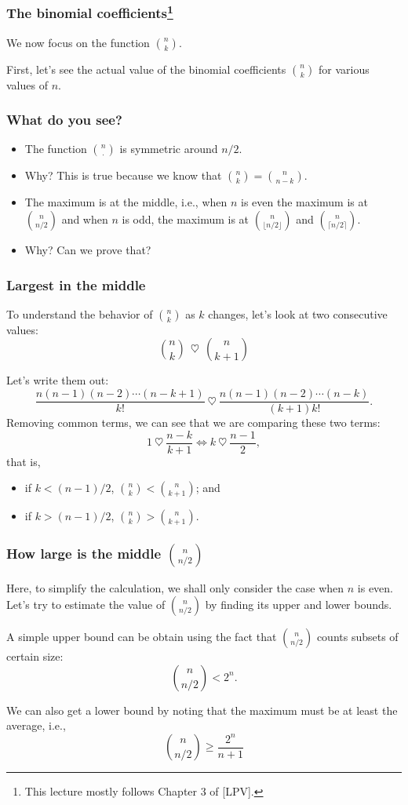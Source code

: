 \begin{frame}\frametitle{The binomial coefficients\footnote{This lecture mostly follows Chapter 3 of [LPV].}}
  We now focus on the function $\binom{n}{k}$.

  First, let's see the actual value of the binomial coefficients
  $\binom{n}{k}$ for various values of $n$.  \vspace{2in}
\end{frame}

\begin{frame}\frametitle{What do you see?}
  \begin{itemize}
  \item The function $\binom{n}{\cdot}$ is symmetric around $n/2$.
  \item Why? \pause This is true because we know that $\binom{n}{k}=\binom{n}{n-k}$. \pause
  \item The maximum is at the middle, i.e., when $n$ is even the
    maximum is at $\binom{n}{n/2}$ and when $n$ is odd, the maximum is
    at $\binom{n}{\lfloor n/2 \rfloor}$ and $\binom{n}{\lceil
      n/2\rceil}$.
  \item Why? \pause Can we prove that?
  \end{itemize}
\end{frame}

\begin{frame}\frametitle{Largest in the middle}
  To understand the behavior of $\binom{n}{k}$ as $k$ changes, let's
  look at two consecutive values:
  \[ \binom{n}{k} \ \ \heartsuit \ \ \binom{n}{k+1}\]
  \pause

  Let's write them out:
  \[ \frac{n(n-1)(n-2)\cdots(n-k+1)}{k!} \ \heartsuit \ \frac{n(n-1)(n-2)\cdots(n-k)}{(k+1)k!}.\]
  \pause
  Removing common terms, we can see that we are comparing these two terms:
  \[ 1 \ \heartsuit \ \frac{n-k}{k+1} \Leftrightarrow k \ \heartsuit \ \frac{n-1}{2},\]
  that is, \pause
  \begin{itemize}
  \item if $k<(n-1)/2$, $\binom{n}{k} < \binom{n}{k+1}$; and
  \item if $k>(n-1)/2$, $\binom{n}{k} > \binom{n}{k+1}$.
  \end{itemize}
\end{frame}

\begin{frame}\frametitle{How large is the middle $\binom{n}{n/2}$}
  Here, to simplify the calculation, we shall only consider the case
  when $n$ is even. Let's try to estimate the value of
  $\binom{n}{n/2}$ by finding its upper and lower bounds.
  \pause

  A simple upper bound can be obtain using the fact that
  $\binom{n}{n/2}$ counts subsets of certain size:
  \[\binom{n}{n/2} < 2^n.\]
  \pause

  We can also get a lower bound by noting that the maximum must be at
  least the average, i.e.,
  \[\binom{n}{n/2} \geq \frac{2^n}{n+1}\]
\end{frame}

